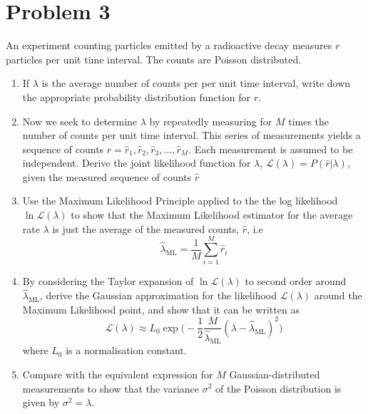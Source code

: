 \documentclass[11pt]{article}
\begin{document}
\section*{Problem 3}
An experiment counting particles emitted by a radioactive decay measures $r$ particles per unit time interval. The counts are Poisson distributed.
\begin{enumerate}
    \item If $\lambda$ is the average number of counts per per unit time interval, write down the appropriate probability distribution function for $r$.
    
    \item Now we seek to determine $\lambda$ by repeatedly measuring for $M$ times the number
of counts per unit time interval. This series of measurements yields a sequence of counts $r = {\hat{r}_1, \hat{r}_2, \hat{r}_3, \dots, \hat{r}_M}$. Each measurement is assumed to be independent. Derive the joint likelihood function for $\lambda$, $\mathcal{L} (\lambda) = P(\hat{r}|\lambda)$, given the measured sequence of counts $\hat{r}$

\item Use the Maximum Likelihood Principle applied to the the log likelihood $\ln \mathcal{L} (\lambda)$ to show that the Maximum Likelihood estimator for the average rate
 $\lambda$ is just the average of the measured counts, $\hat{r}$, i.e
 \begin{equation}
     \hat{\lambda}_{\text{ML}} = \frac{1}{M}\sum_{i=1}^{M}\hat{r}_i
\end{equation}  
\item By considering the Taylor expansion of $\ln \mathcal{L} (\lambda)$ to second order around $\hat{\lambda}_{\text{ML}}$,
derive the Gaussian approximation for the likelihood $\mathcal{L} (\lambda)$ around the Maximum Likelihood point, and show that it can be written as
\begin{equation}
    \mathcal{L}(\lambda) \approx L_0\exp\Big(-\frac{1}{2}\frac{M}{\hat{\lambda}_{\text{ML}}}(\lambda -\hat{\lambda}_{\text{ML}})^2\Big)
\end{equation}
where $L_0$ is a normalisation constant.

\item Compare with the equivalent expression for $M$ Gaussian-distributed measurements to show that the variance $\sigma^2$ of the Poisson distribution is given by $\sigma^2 = \lambda$.
 
\end{enumerate}
\end{document}
